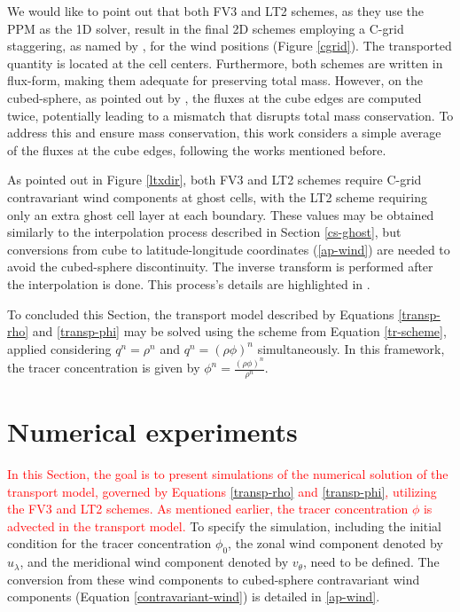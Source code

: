 \documentclass[preprint,12pt]{elsarticle}
\begin{document}
\begin{linenumbers}
We would like to point out that both FV3 and LT2 schemes, as they use the PPM as the 1D solver, result in the final 2D schemes employing a C-grid staggering, as named by \cite{arakawa:1977}, for the wind positions (Figure \ref{cgrid}). 
The transported quantity is located at the cell centers.
Furthermore, both schemes are written in flux-form, making them adequate for preserving total mass. 
However, on the cubed-sphere, as pointed out by \cite{ross:2006,chen:2021,mouallem:2023}, the fluxes at the cube edges are computed twice, potentially leading to a mismatch that disrupts total mass conservation. 
To address this and ensure mass conservation, this work considers a simple average of the fluxes at the cube edges, following the works mentioned before.

As pointed out in Figure \ref{ltxdir}, both FV3 and LT2 schemes require C-grid contravariant wind components at ghost cells, with the LT2 scheme requiring only an extra ghost cell layer at each boundary.
These values may be obtained similarly to the interpolation process described in Section \ref{cs-ghost}, but conversions from cube to latitude-longitude coordinates (\ref{ap-wind}) are needed to avoid the cubed-sphere discontinuity. The inverse transform is performed after the interpolation is done.
This process's details are highlighted in \cite[Section 2.3]{mouallem:2023}.

To concluded this Section, the transport model described by Equations \eqref{transp-rho} and \eqref{transp-phi} may be solved using the scheme from Equation \eqref{tr-scheme}, applied considering $q^n=\rho^n$ and $q^n=(\rho \phi)^n$ simultaneously.
In this framework, the tracer concentration is given by $\phi^n = \frac{(\rho \phi)^n}{\rho^n}$.

\section{Numerical experiments}
\label{num-exp}
\textcolor{red}{
In this Section, the goal is to present simulations of the numerical solution of the transport model, governed by Equations \eqref{transp-rho} and \eqref{transp-phi}, utilizing the FV3 and LT2 schemes. As mentioned earlier, the tracer concentration $\phi$ is advected in the transport model.}
To specify the simulation, including the initial condition for the tracer concentration $\phi_0$, the zonal wind component  denoted by $u_\lambda$, and the meridional wind component denoted by $v_\theta$, need to be defined.
The conversion from these wind components to cubed-sphere contravariant wind components (Equation \eqref{contravariant-wind}) is detailed in \ref{ap-wind}.


\end{linenumbers}
\end{document}
